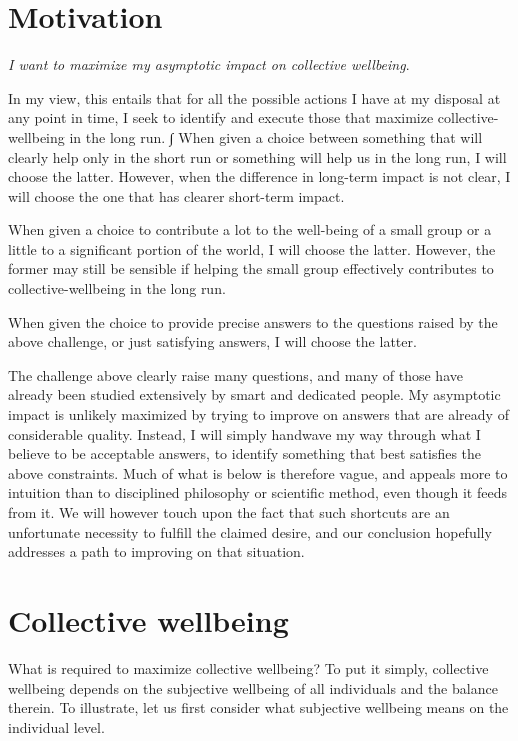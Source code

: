 \section{Motivation}

{\it I want to maximize my asymptotic impact on collective wellbeing}.

In my view, this entails that for all the possible actions I have at my disposal at any point in time, I seek to identify and execute those that maximize collective-wellbeing in the long run.
∫
When given a choice between something that will clearly help only in the short run or something will help us in the long run, I will choose the latter. However, when the difference in long-term impact is not clear, I will choose the one that has clearer short-term impact.

When given a choice to contribute a lot to the well-being of a small group or a little to a significant portion of the world, I will choose the latter. However, the former may still be sensible if helping the small group effectively contributes to collective-wellbeing in the long run.

When given the choice to provide precise answers to the questions raised by the above challenge, or just satisfying answers, I will choose the latter.

The challenge above clearly raise many questions, and many of those have already been studied extensively by smart and dedicated people. My asymptotic impact is unlikely maximized by trying to improve on answers that are already of considerable quality. Instead, I will simply handwave my way through what I believe to be acceptable answers, to identify something that best satisfies the above constraints. Much of what is below is therefore vague, and appeals more to intuition than to disciplined philosophy or scientific method, even though it feeds from it. We will however touch upon the fact that such shortcuts are an unfortunate necessity to fulfill the claimed desire, and our conclusion hopefully addresses a path to improving on that situation.

\section{Collective wellbeing}

What is required to maximize collective wellbeing? To put it simply, collective wellbeing depends on the subjective wellbeing of all individuals and the balance therein. To illustrate, let us first consider what subjective wellbeing means on the individual level.

